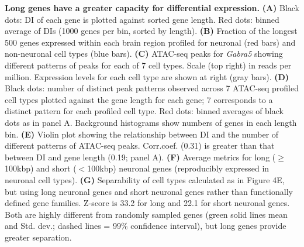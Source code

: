 \textbf{Long genes have a greater capacity for differential expression.}
\textbf{(A)} Black dots: DI of each gene is plotted against sorted gene length. Red dots: binned average of DIs (1000 genes per bin, sorted by length). 
\textbf{(B)} Fraction of the longest 500 genes expressed within each brain region profiled for neuronal (red bars) and non-neuronal cell types (blue bars).
\textbf{(C)} ATAC-seq peaks for \textit{Gabra5} showing different patterns of peaks for each of 7 cell types. Scale (top right) in reads per million.  Expression levels for each cell type are shown at right (gray bars).
\textbf{(D)} Black dots: number of distinct peak patterns observed across 7 ATAC-seq profiled cell types plotted against the gene length for each gene; 7 corresponds to a distinct pattern for each profiled cell type. Red dots: binned averages of black dots as in panel A. Background histograms show numbers of genes in each length bin. 
\textbf{(E)} Violin plot showing the relationship between DI and the number of different patterns of ATAC-seq peaks. Corr.coef. (0.31) is greater than that between DI and gene length (0.19; panel A).
\textbf{(F)} Average metrics for long ($\geq$100kbp) and short ($<$100kbp) neuronal genes (reproducibly expressed in neuronal cell types). 
\textbf{(G)} Separability of cell types calculated as in Figure 4E, but using long neuronal genes and short neuronal genes rather than functionally defined gene families. Z-score is 33.2 for long and 22.1 for short neuronal genes. Both are highly different from randomly sampled genes (green solid lines mean and Std. dev.; dashed lines = 99\% confidence interval), but long genes provide greater separation.
